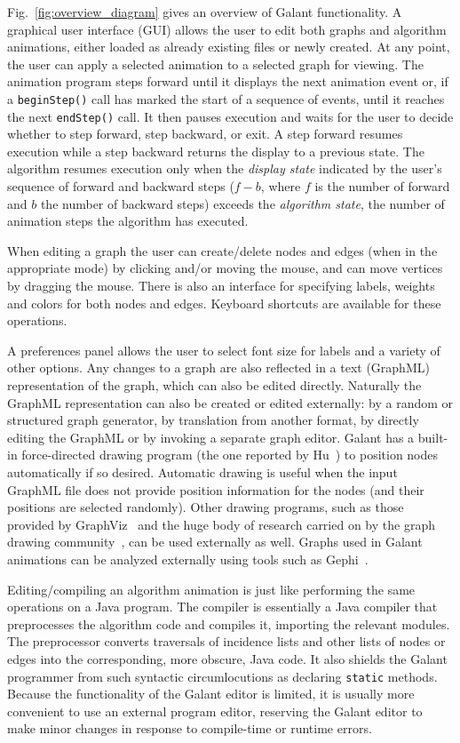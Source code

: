 Fig.~\ref{fig:overview_diagram} gives an overview of Galant functionality.
A graphical user interface (GUI) allows the user to edit both graphs and
algorithm animations, either loaded as already existing files or newly
created. At any point, the user can apply a selected animation to a selected
graph for viewing.
The animation program 
steps forward until it
displays the next animation event or, if a \texttt{beginStep()}
call has marked the start of a sequence of events, until
it reaches the next \texttt{endStep()} call.
It then pauses execution and waits for the user to decide whether to
step forward, step backward, or exit.
A step forward resumes execution while a step backward returns the display to a previous
state.
The algorithm resumes execution only when the \emph{display state}
indicated by the user's sequence of forward and backward steps
($f-b$, where $f$ is the number of forward and $b$ the number of backward steps)
exceeds the \emph{algorithm state}, the number of animation steps the algorithm
has executed.

When editing a graph the user can create/delete nodes and edges (when in the appropriate mode)
by clicking and/or
moving the mouse, and can move vertices by dragging the mouse.
There is also an interface for specifying labels, weights and colors for both
nodes and edges.
Keyboard shortcuts are available for these operations.
 
A preferences panel allows the user to select font size for labels and a
variety of other options.
Any changes to a graph are also reflected in a text (GraphML) representation
of the graph, which can also be edited directly. Naturally the GraphML
representation can also be created or edited externally: by a random or
structured graph generator, by translation from another format, by directly
editing the GraphML or by invoking a separate graph editor.
Galant has a built-in force-directed drawing program 
(the one reported by Hu~\cite{2006-Mathematica-Hu}) to position nodes
automatically if so desired.
Automatic drawing is useful when the input GraphML file does not provide position
information for the nodes (and their positions are selected randomly).
Other drawing programs, such as those provided by GraphViz~\cite{GraphViz}
and the huge body of research carried on by the graph drawing community~\cite{graph_drawing},
can be used externally as well.
Graphs used in Galant animations
can be analyzed externally using tools such as Gephi~\cite{gephi}.

Editing/compiling an algorithm animation is just like performing the same
operations on a Java program.
The compiler is essentially a Java
compiler that preprocesses the algorithm code
and compiles it, importing the relevant modules.
The preprocessor converts traversals of incidence lists and other
lists of nodes or edges into the corresponding, more obscure, Java code.
It also shields the Galant programmer from such syntactic circumlocutions
as declaring \texttt{static} methods.
Because the functionality of the Galant editor is limited, it is usually more
convenient to use an external program editor, reserving the Galant editor to
make minor changes in response to compile-time or runtime errors.

